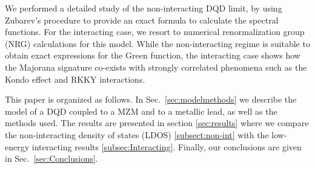\documentclass[showpacs,aps,prb,reprint,superscriptaddress]{revtex4-1}
\newcommand{\LUIS}[1]{\textcolor{blue}{\fbox{Luis} {\sl#1}}}
\begin{document}
 We performed a detailed study of the non-interacting DQD limit, by using Zubarev's procedure  \cite{zubarev_double-time_1960} to provide an exact formula to calculate the spectral functions. For the interacting case, we resort to numerical renormalization group (NRG)\cite{bulla_numerical_2008} calculations for this model.
 While the non-interacting regime is suitable to obtain exact expressions for the Green function, the interacting case  shows how the Majorana signature co-exists with strongly correlated phenomena such as the Kondo effect \cite{hewson_kondo_1997} and RKKY interactions.   \cite{ruderman_indirect_1954,kasuya_theory_1956,yosida_magnetic_1957} 


This paper is organized as follows. In Sec.\ \ref{sec:modelmethods} we describe the model of a DQD coupled to a MZM and to a metallic lead, as well as the methods used.  The results are presented in section \ref{sec:results} where we compare the non-interacting density of states (LDOS) \ref{subsect:non-int} with the low-energy  interacting results \ref{subsec:Interacting}. Finally, our conclusions are given in Sec.\ \ref{sec:Conclusions}.






 
\end{document}
